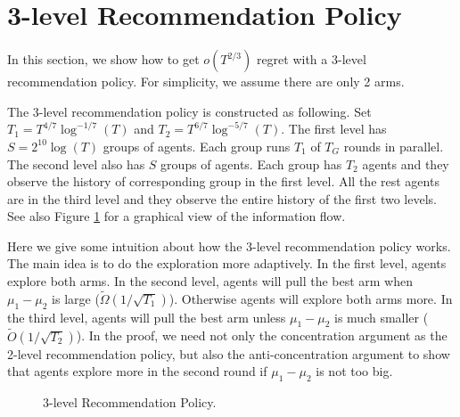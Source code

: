 
\section{3-level Recommendation Policy}
In this section, we show how to get $o(T^{2/3})$ regret with a 3-level recommendation policy. For simplicity, we assume there are only 2 arms.

The 3-level recommendation policy is constructed as following. Set $T_1 = T^{4/7}\log^{-1/7}(T)$ and $T_2 = T^{6/7}\log^{-5/7}(T)$. The first level has $S = 2^{10}\log(T)$ groups of agents. Each group runs $T_1$ \ALGG of $T_G$ rounds in parallel. The second level also has $S$ groups of agents. Each group has $T_2$ agents and they observe the history of corresponding group in the first level. All the rest agents are in the third level and they observe the entire history of the first two levels. 
See also Figure \ref{fig:3level} for a graphical view of the information flow.

Here we give some intuition about how the 3-level recommendation policy works. The main idea is to do the exploration more adaptively. In the first level, agents explore both arms. In the second level, agents will pull the best arm when $\mu_1 - \mu_2$ is large ($\tilde{\Omega}(1/\sqrt{T_1})$). Otherwise agents will explore both arms more. In the third level, agents will pull the best arm unless $\mu_1-\mu_2$ is much smaller ($\tilde{O}(1/\sqrt{T_2})$). In the proof, we need not only the concentration argument as the 2-level recommendation policy, but also the anti-concentration argument to show that agents explore more in the second round if $\mu_1-\mu_2$ is not too big.

\begin{figure}[H]
\centering
{}
\caption{3-level Recommendation Policy.}
\label{fig:3level}
\end{figure}

